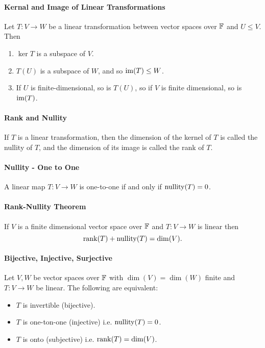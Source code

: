 \paragraph{Kernal and Image of Linear Transformations}
Let \(T: V \to W\) be a linear transformation between vector spaces over \(\mathbb{F}\) and \(U \leq V\). Then
\begin{enumerate}
    \item \(\ker T\) is a subspace of \(V\).
    \item \(T(U)\) is a subspace of \(W\), and so \(\operatorname{im}(T) \leq W\).
    \item If \(U\) is finite-dimensional, so is \(T(U)\), so if \(V\) is finite dimensional, so is \(\operatorname{im}(T)\).
\end{enumerate}

\paragraph{Rank and Nullity}
If \(T\) is a linear transformation, then the dimension of the kernel of \(T\) is called the nullity of \(T\), and the dimension of its image is called the rank of \(T\).

\paragraph{Nullity - One to One}
A linear map \(T: V \to W\) is one-to-one if and only if \(\mathrm{nullity}(T) = 0\).

\paragraph{Rank-Nullity Theorem}
If \(V\) is a finite dimensional vector space over \(\mathbb{F}\) and \(T: V \to W\) is linear then
\[\rank(T) + \mathrm{nullity}(T) = \dim(V).\]

\paragraph{Bijective, Injective, Surjective}
Let \(V, W\) be vector spaces over \(\mathbb{F}\) with \(\dim(V) = \dim(W)\) finite and \(T: V \to W\) be linear. The following are equivalent:
\begin{itemize}
    \item \(T\) is invertible (bijective).
    \item \(T\) is one-ton-one (injective) i.e. \(\mathrm{nullity}(T) = 0\).
    \item \(T\) is onto (subjective) i.e. \(\rank(T) = \dim(V)\).
\end{itemize}

